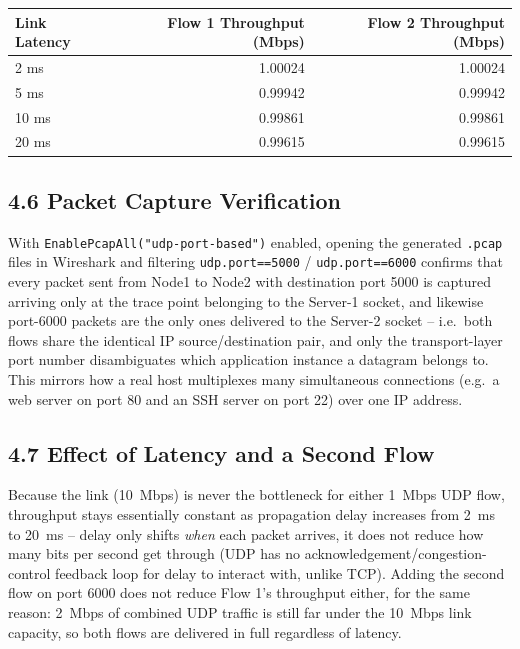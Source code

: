 \documentclass[11pt]{article}
\begin{document}
\begin{center}
\renewcommand{\arraystretch}{1.2}
\begin{tabular}{lrr}
\toprule
\textbf{Link Latency} & \textbf{Flow 1 Throughput (Mbps)} & \textbf{Flow 2 Throughput (Mbps)} \\
\midrule
2 ms  & 1.00024 & 1.00024 \\
5 ms  & 0.99942 & 0.99942 \\
10 ms & 0.99861 & 0.99861 \\
20 ms & 0.99615 & 0.99615 \\
\bottomrule
\end{tabular}
\end{center}

\subsection*{4.6 Packet Capture Verification}
With \texttt{EnablePcapAll("udp-port-based")} enabled, opening the generated
\texttt{.pcap} files in Wireshark and filtering \texttt{udp.port==5000} /
\texttt{udp.port==6000} confirms that every packet sent from Node1 to Node2
with destination port 5000 is captured arriving only at the trace point
belonging to the Server-1 socket, and likewise port-6000 packets are the only
ones delivered to the Server-2 socket -- i.e.\ both flows share the identical
IP source/destination pair, and only the transport-layer port number
disambiguates which application instance a datagram belongs to. This mirrors
how a real host multiplexes many simultaneous connections (e.g.\ a web server
on port 80 and an SSH server on port 22) over one IP address.

\subsection*{4.7 Effect of Latency and a Second Flow}
Because the link (10~Mbps) is never the bottleneck for either 1~Mbps UDP
flow, throughput stays essentially constant as propagation delay increases
from 2~ms to 20~ms -- delay only shifts \emph{when} each packet arrives, it
does not reduce how many bits per second get through (UDP has no
acknowledgement/congestion-control feedback loop for delay to interact
with, unlike TCP). Adding the second flow on port 6000 does not reduce Flow
1's throughput either, for the same reason: 2~Mbps of combined UDP traffic
is still far under the 10~Mbps link capacity, so both flows are delivered in
full regardless of latency.
\end{document}
